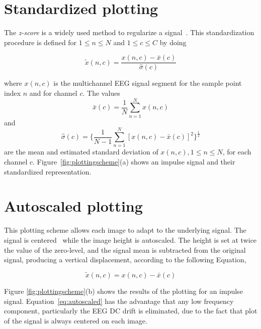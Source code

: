 \section{Standardized plotting}
\label{standardized}

The \textit{z-score} is a widely used method to regularize a signal~\cite{VandenBerg2006,Zhang2013}. This standardization procedure is defined for  $1 \leq n \leq N$ and $1 \leq c \leq C$ by doing

\begin{equation}
\tilde{x}(n,c) =  \frac{ x(n,c) - \bar{x}(c) }{ \hat{\sigma}(c) } 
\label{eq:standarizedaverages}
\end{equation}

\noindent  where $ x(n,c) $ is the multichannel EEG signal segment for the sample point index $n$ and for channel $c$. The values $$\bar{x}(c) =\frac{1}{N}\sum_{n=1}^{N}x(n,c)$$ and $$ \hat{\sigma}(c) =   \bigg \{ \frac{1}{N-1}\sum_{n=1}^{N} { \left[ x(n,c)-\bar{x}(c) \right]  }^2 \bigg \}^{\frac{1}{2}}$$ are the mean and estimated standard deviation of $x(n,c), 1 \leq n \leq N$, for each channel $c$. Figure~\ref{fig:plottingscheme}(a) shows an impulse signal and their standardized representation.

\section{Autoscaled plotting}
\label{autoscaled}

This plotting scheme allows each image to adapt to the underlying signal.  The signal is centered~\cite{VandenBerg2006} while the image height is autoscaled. The height is set at twice the value of the zero-level, and the signal mean is subtracted from the original signal, producing a vertical displacement, according to the following Equation,

\begin{equation}
\tilde{x}(n,c) =  x(n,c) - \bar{x}(c) 
\label{eq:autoscaled}
\end{equation}

Figure \ref{fig:plottingscheme}(b) shows the results of the plotting for an impulse signal.  Equation~\ref{eq:autoscaled} has the advantage that any low frequency component, particularly the EEG DC drift is eliminated, due to the fact that plot of the signal is always centered on each image.

